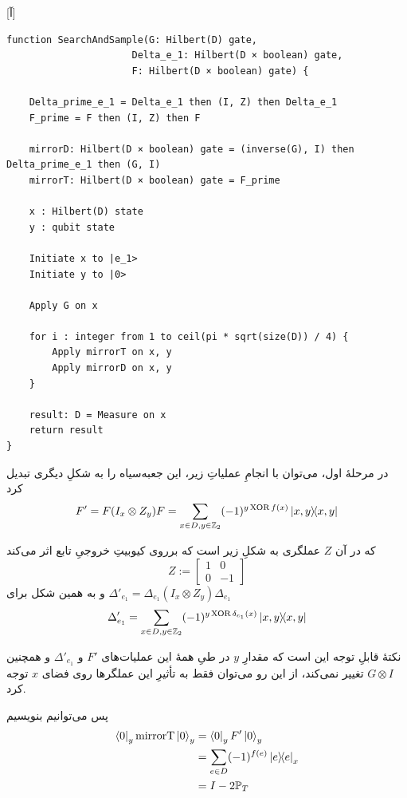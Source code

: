 \documentclass[a4paper,12pt]{article}
\DeclareMathOperator{\XOR}{XOR}
\begin{document}
[آ]
\begin{latin}
\begin{lstlisting}
function SearchAndSample(G: Hilbert(D) gate, 
                      Delta_e_1: Hilbert(D × boolean) gate,
                      F: Hilbert(D × boolean) gate) {

    Delta_prime_e_1 = Delta_e_1 then (I, Z) then Delta_e_1
    F_prime = F then (I, Z) then F

    mirrorD: Hilbert(D × boolean) gate = (inverse(G), I) then Delta_prime_e_1 then (G, I)
    mirrorT: Hilbert(D × boolean) gate = F_prime

    x : Hilbert(D) state
    y : qubit state

    Initiate x to |e_1>
    Initiate y to |0>

    Apply G on x
    
    for i : integer from 1 to ceil(pi * sqrt(size(D)) / 4) {
        Apply mirrorT on x, y
        Apply mirrorD on x, y
    }

    result: D = Measure on x
    return result
}
\end{lstlisting}
\end{latin}

در مرحلهٔ اول، می‌توان با انجامِ عملیاتِ زیر، این جعبه‌سیاه را به شکلِ دیگری تبدیل کرد
\begin{equation}
    F' = F (I_x \otimes Z_y) F = \sum_{x \in D, y \in \mathbb{Z}_2} (-1)^{y \XOR f(x)}\dyad{x, y}{x, y}
\end{equation}

که در آن $Z$ عملگری به شکلِ زیر است که برروی کیوبیتِ خروجیِ تابع اثر می‌کند
\begin{equation}
    Z := \begin{bmatrix}
    1 & 0 \\
    0 & -1
\end{bmatrix}
\end{equation}
و به همین شکل برای 
$\Delta'_{e_1} = \Delta_{e_1} (I_x \otimes Z_y) \Delta_{e_1}$
\begin{equation}
    \Delta'_{e_1} = \sum_{x \in D, y \in \mathbb{Z}_2} (-1)^{y \XOR \delta_{e_1}(x)}\dyad{x, y}{x, y}
\end{equation}

نکتهٔ قابلِ توجه این است که مقدارِ $y$ در طیِ همهٔ این عملیات‌های $F'$ و $\Delta'_{e_1}$ و همچنین $G \otimes I$ تغییر نمی‌کند، از این رو می‌توان فقط به تأثیرِ این عملگرها روی فضای $x$ توجه کرد.

پس می‌توانیم بنویسیم
\begin{align}
    \bra{0}_y \mathrm{mirrorT} \ket{0}_y &= \bra{0}_y F' \ket{0}_y \\ 
    &= \sum_{e \in D} (-1)^{f(e)}\dyad{e}_x \\
    &= I - 2\mathbb{P}_T
\end{align}
\end{document}
